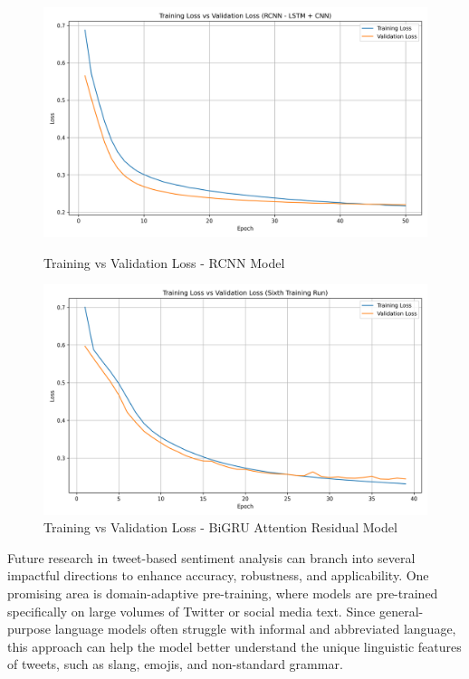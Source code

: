 \documentclass{article}
\begin{document}
\begin{figure}[H]
  \centering
  \begin{minipage}[b]{0.45\textwidth}
    \centering
    \includegraphics[width=0.9\linewidth]{rcnn_loss_curve.png}
    \caption{Training vs Validation Loss - RCNN Model}
    \label{fig:image1}
  \end{minipage}
  \hfill
  \begin{minipage}[b]{0.45\textwidth}
    \centering
    \includegraphics[width=0.9\linewidth]{bigru_loss_curve.png}
    \caption{Training vs Validation Loss - BiGRU Attention Residual Model}
    \label{fig:image2}
  \end{minipage}
\end{figure}

Future research in tweet-based sentiment analysis can branch into several impactful directions to enhance accuracy, robustness, and applicability. One promising area is domain-adaptive pre-training, where models are pre-trained specifically on large volumes of Twitter or social media text. Since general-purpose language models often struggle with informal and abbreviated language, this approach can help the model better understand the unique linguistic features of tweets, such as slang, emojis, and non-standard grammar.
\end{document}
